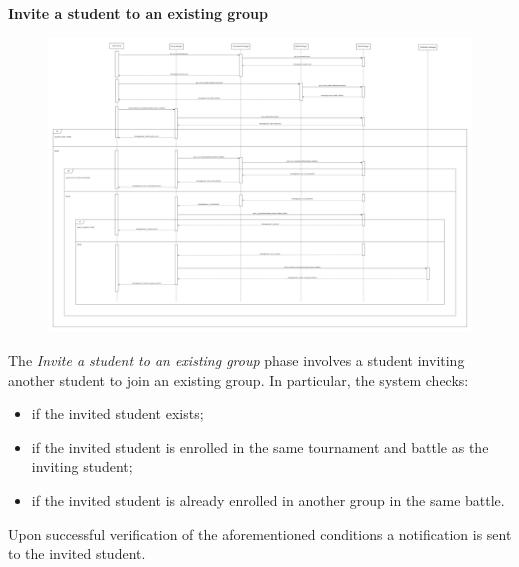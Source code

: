 \documentclass[../DD.tex]{subfiles}
\begin{document}
    \textbf{Invite a student to an existing group}\\
    \begin{figure}[H]
        \centering
        \hspace*{-3cm}
        \includegraphics[width=1.4\textwidth]{../assets/section_2/InviteStudentsToExistingGroup.png}
    \end{figure}
    \newpage
    The \textit{Invite a student to an existing group} phase involves a student inviting another student to join an existing group.
    In particular, the system checks:
    \begin{itemize}
        \item {if the invited student exists;}
        \item {if the invited student is enrolled in the same tournament and battle as the inviting student;}
        \item {if the invited student is already enrolled in another group in the same battle.}
    \end{itemize}
    Upon successful verification of the aforementioned conditions a notification is sent to the invited student.
    \newpage
\end{document}
